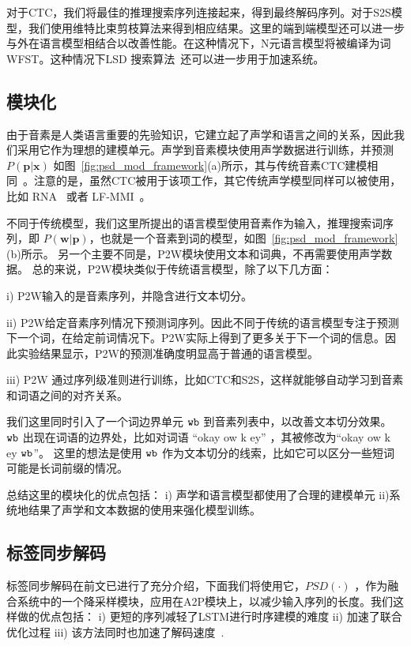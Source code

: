 对于CTC，我们将最佳的推理搜索序列连接起来，得到最终解码序列。对于S2S模型，我们使用维特比束剪枝算法来得到相应结果。这里的端到端模型还可以进一步与外在语言模型相结合以改善性能。在这种情况下，N元语言模型将被编译为词WFST。这种情况下LSD 搜索算法~\cite{zhc00-chen-tasl2017}还可以进一步用于加速系统。


\subsection{模块化}
\label{sec:psd_mod_modu}
由于音素是人类语言重要的先验知识，它建立起了声学和语言之间的关系，因此我们采用它作为理想的建模单元。声学到音素模块使用声学数据进行训练，并预测 $P(\mathbf{p}|\mathbf{x})$ 如图~\ref{fig:psd_mod_framework}(a)所示，其与传统音素CTC建模相同~\cite{miao2015eesen}。注意的是，虽然CTC被用于该项工作，其它传统声学模型同样可以被使用，比如 RNA~\cite{sak2017recurrent} 或者 LF-MMI~\cite{povey2016purely}。

不同于传统模型，我们这里所提出的语言模型使用音素作为输入，推理搜索词序列，即 $P(\mathbf{w}|\mathbf{p})$，也就是一个音素到词的模型，如图~\ref{fig:psd_mod_framework}(b)所示。
另一个主要不同是，P2W模块使用文本和词典，不再需要使用声学数据。
总的来说，P2W模块类似于传统语言模型，除了以下几方面：

i) P2W输入的是音素序列，并隐含进行文本切分。

ii) P2W给定音素序列情况下预测词序列。因此不同于传统的语言模型专注于预测下一个词，在给定前词情况下。P2W实际上得到了更多关于下一个词的信息。因此实验结果显示，P2W的预测准确度明显高于普通的语言模型。

iii) P2W 通过序列级准则进行训练，比如CTC和S2S，这样就能够自动学习到音素和词语之间的对齐关系。


我们这里同时引入了一个词边界单元 $\tt wb$ 到音素列表中，以改善文本切分效果。 $\tt wb$ 出现在词语的边界处，比如对词语 ``okay ow k ey'' ，其被修改为``okay ow k ey $\tt wb$''。 这里的想法是使用 $\tt wb$ 作为文本切分的线索，比如它可以区分一些短词可能是长词前缀的情况。

总结这里的模块化的优点包括： i) 声学和语言模型都使用了合理的建模单元 ii)系统地结果了声学和文本数据的使用来强化模型训练。


\subsection{标签同步解码}
\label{sec:psd_mod_psd}
标签同步解码在前文已进行了充分介绍，下面我们将使用它，$PSD(\cdot)$ ，作为融合系统中的一个降采样模块，应用在A2P模块上，以减少输入序列的长度。我们这样做的优点包括： i) 更短的序列减轻了LSTM进行时序建模的难度 ii)  加速了联合优化过程 iii) 该方法同时也加速了解码速度~\cite{zhc00-chen-tasl2017}.


